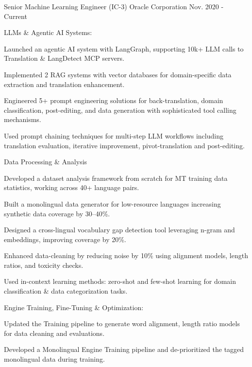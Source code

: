 \begin{cventries}
  \cvexperience
    {Senior Machine Learning Engineer (IC-3)}
    {Oracle Corporation}
    {}
    {}
    {Nov. 2020 - Current}
    {
      \begin{cvitemswithheading}
        {LLMs \& Agentic AI Systems:}
        \item {Launched an agentic AI system with LangGraph, supporting 10k+ LLM calls to Translation \& LangDetect MCP servers.}
        \item {Implemented 2 RAG systems with vector databases for domain-specific data extraction and translation enhancement.}
        \item {Engineered 5+ prompt engineering solutions for back-translation, domain classification, post-editing, and data generation with sophisticated tool calling mechanisms.}
        \item {Used prompt chaining techniques for multi-step LLM workflows including translation evaluation, iterative improvement, pivot-translation and post-editing.}
      \end{cvitemswithheading}
    }
  \cvexpproj
  {
    \begin{cvitemswithheading}
        {Data Processing \& Analysis}
         \item {Developed a dataset analysis framework from scratch for MT training data statistics, working across 40+ language pairs.}
        \item {Built a monolingual data generator for low-resource languages increasing synthetic data coverage by 30–40\%.}
        \item {Designed a cross-lingual vocabulary gap detection tool leveraging n-gram and embeddings, improving coverage by 20\%.}
        \item {Enhanced data-cleaning by reducing noise by 10\% using alignment models, length ratios, and toxicity checks.}
        \item {Used in-context learning methods: zero-shot and few-shot learning for domain classification \& data categorization tasks.}
    \end{cvitemswithheading}
  }
  \cvexpproj
  {
    \begin{cvitemswithheading}
        {Engine Training, Fine-Tuning \& Optimization:}
        \item {Updated the Training pipeline to generate word alignment, length ratio models for data cleaning and evaluations.}
        \item {Developed a Monolingual Engine Training pipeline and de-prioritized the tagged monolingual data during training.}

\end{cvitemswithheading}}
\end{cventries}
